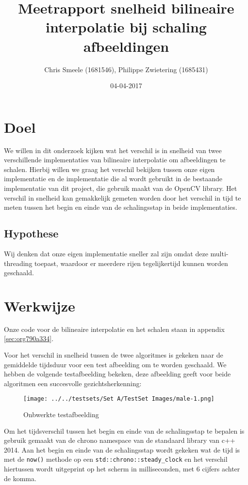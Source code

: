 \documentclass[a4paper]{article}
\author{Chris Smeele (1681546), Philippe Zwietering (1685431)}
\date{04-04-2017}
\title{Meetrapport snelheid bilineaire interpolatie bij schaling afbeeldingen}
\begin{document}
\maketitle
\setcounter{tocdepth}{2}
\tableofcontents


\section{Doel}
\label{sec:org0ed4d15}
We willen in dit onderzoek kijken wat het verschil is in snelheid van twee verschillende implementaties van bilineaire interpolatie om afbeeldingen te schalen. Hierbij willen we graag het verschil bekijken tussen onze eigen implementatie en de implementatie die al wordt gebruikt in de bestaande implementatie van dit project, die gebruik maakt van de OpenCV library. Het verschil in snelheid kan gemakkelijk gemeten worden door het verschil in tijd te meten tussen het begin en einde van de schalingsstap in beide implementaties.

\subsection{Hypothese}
\label{sec:org19fdb4a}
Wij denken dat onze eigen implementatie sneller zal zijn omdat deze multi-threading toepast, waardoor er meerdere rijen tegelijkertijd kunnen worden geschaald.

\section{Werkwijze}
\label{sec:orgf17ef6f}
Onze code voor de bilineaire interpolatie en het schalen staan in appendix \ref{sec:org790a334}.

Voor het verschil in snelheid tussen de twee algoritmes is gekeken naar de gemiddelde tijdsduur voor een test afbeelding om te worden geschaald. We hebben de volgende testafbeelding bekeken, deze afbeelding geeft voor beide algoritmen een succesvolle gezichtsherkenning: 

\begin{figure}[htbp]
\centering
\texttt{[image: ../../testsets/Set A/TestSet Images/male-1.png]}
\caption{\label{fig:orgb2d1de9}
Onbwerkte testafbeelding}
\end{figure}

Om het tijdsverschil tussen het begin en einde van de schalingsstap te bepalen is gebruik gemaakt van de chrono namespace van de standaard library van c++ 2014. Aan het begin en einde van de schalingsstap wordt gekeken wat de tijd is met de \texttt{now()} methode op een \texttt{std::chrono::steady\_clock} en het verschil hiertussen wordt uitgeprint op het scherm in milliseconden, met 6 cijfers achter de komma.
\end{document}

